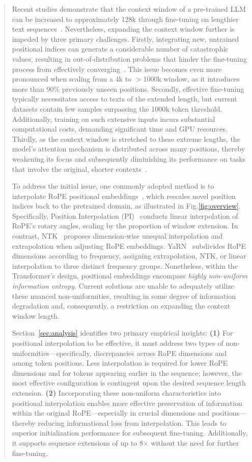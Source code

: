 \begin{abstract}
Recent studies demonstrate that the context window of a pre-trained LLM can be increased to approximately 128k through fine-tuning on lengthier text sequences~\cite{longlora,pi,yarn,zhang2024soaring,liu2023scaling}. Nevertheless, expanding the context window further is impeded by three primary challenges. Firstly, integrating new, untrained positional indices can generate a considerable number of catastrophic values, resulting in out-of-distribution problems that hinder the fine-tuning process from effectively converging~\cite{pi}. This issue becomes even more pronounced when scaling from a 4k to $>$1000k window, as it introduces more than 90\% previously unseen positions. Secondly, effective fine-tuning typically necessitates access to texts of the extended length, but current datasets contain few samples surpassing the 1000k token threshold. Additionally, training on such extensive inputs incurs substantial computational costs, demanding significant time and GPU resources. Thirdly, as the context window is stretched to these extreme lengths, the model's attention mechanism is distributed across many positions, thereby weakening its focus and subsequently diminishing its performance on tasks that involve the original, shorter contexts~\cite{pi}.

To address the initial issue, one commonly adopted method is to interpolate RoPE positional embeddings~\cite{rope,pi}, which rescales novel position indices back to the pretrained domain, as illustrated in Fig.\ref{fig:overview}. Specifically, Position Interpolation (PI)~\cite{pi} conducts linear interpolation of RoPE’s rotary angles, scaling by the proportion of window extension. In contrast, NTK~\cite{ntk,dynamicntk} proposes dimension-wise unequal interpolation and extrapolation when adjusting RoPE embeddings. YaRN~\cite{yarn} subdivides RoPE dimensions according to frequency, assigning extrapolation, NTK, or linear interpolation to three distinct frequency groups. Nonetheless, within the Transformer’s design, positional embeddings encompass \emph{highly non-uniform information entropy}. Current solutions are unable to adequately utilize these nuanced non-uniformities, resulting in some degree of information degradation and, consequently, a restriction on expanding the context window length.

Section~\ref{sec:analysis} identifies two primary empirical insights: \textbf{(1)} For positional interpolation to be effective, it must address two types of non-uniformities—specifically, discrepancies across RoPE dimensions and among token positions. Less interpolation is required for lower RoPE dimensions and for tokens appearing earlier in the sequence; however, the most effective configuration is contingent upon the desired sequence length extension.
  \textbf{(2)} Incorporating these non-uniform characteristics into positional interpolation enables more effective preservation of information within the original RoPE—especially in crucial dimensions and positions—thereby reducing informational loss from interpolation. This leads to superior initialization performance for subsequent fine-tuning. Additionally, it supports sequence extensions of up to 8$\times$ without the need for further fine-tuning.


\end{abstract}

